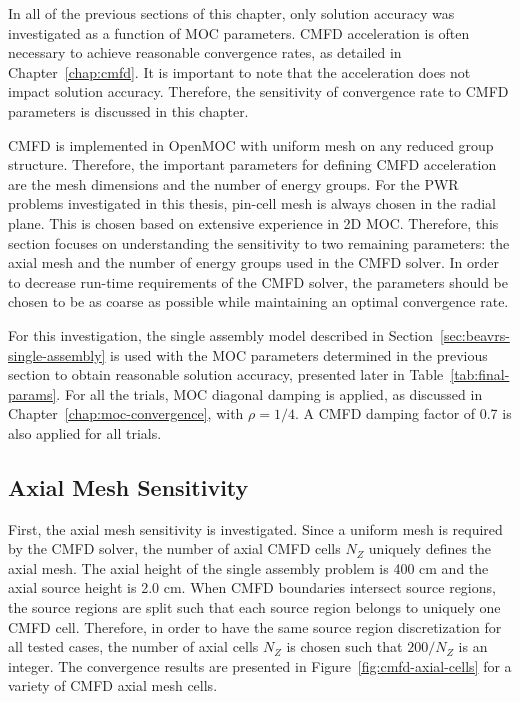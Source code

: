 In all of the previous sections of this chapter, only solution accuracy was investigated as a function of \ac{MOC} parameters. \ac{CMFD} acceleration is often necessary to achieve reasonable convergence rates, as detailed in Chapter~\ref{chap:cmfd}. It is important to note that the acceleration does not impact solution accuracy. Therefore, the sensitivity of convergence rate to \ac{CMFD} parameters is discussed in this chapter.

\ac{CMFD} is implemented in OpenMOC with uniform mesh on any reduced group structure. Therefore, the important parameters for defining \ac{CMFD} acceleration are the mesh dimensions and the number of energy groups. For the \ac{PWR} problems investigated in this thesis, pin-cell mesh is always chosen in the radial plane. This is chosen based on extensive experience in 2D \ac{MOC}. Therefore, this section focuses on understanding the sensitivity to two remaining parameters: the axial mesh and the number of energy groups used in the \ac{CMFD} solver. In order to decrease run-time requirements of the \ac{CMFD} solver, the parameters should be chosen to be as coarse as possible while maintaining an optimal convergence rate.

For this investigation, the single assembly model described in Section~\ref{sec:beavrs-single-assembly} is used with the \ac{MOC} parameters determined in the previous section to obtain reasonable solution accuracy, presented later in Table~\ref{tab:final-params}. For all the trials, \ac{MOC} diagonal damping is applied, as discussed in Chapter~\ref{chap:moc-convergence}, with $\rho = 1/4$. A \ac{CMFD} damping factor of 0.7 is also applied for all trials.

\subsection{Axial Mesh Sensitivity}
First, the axial mesh sensitivity is investigated. Since a uniform mesh is required by the \ac{CMFD} solver, the number of axial \ac{CMFD} cells $N_Z$ uniquely defines the axial mesh. The axial height of the single assembly problem is 400 cm and the axial source height is 2.0 cm. When \ac{CMFD} boundaries intersect source regions, the source regions are split such that each source region belongs to uniquely one \ac{CMFD} cell. Therefore, in order to have the same source region discretization for all tested cases, the number of axial cells $N_Z$ is chosen such that $200 / N_Z$ is an integer. The convergence results are presented in Figure~\ref{fig:cmfd-axial-cells} for a variety of \ac{CMFD} axial mesh cells. 

